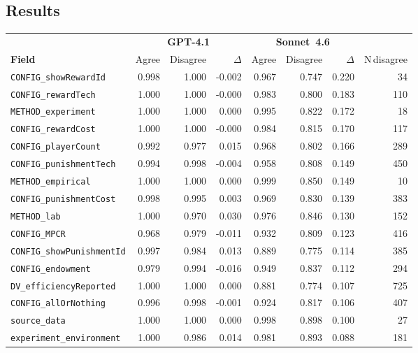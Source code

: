\documentclass[11pt,a4paper]{article}
\begin{document}
\subsection{Results}
\begin{center}\small
\begin{tabular}{lrr@{\hskip 6pt}rrr@{\hskip 6pt}rr}
\toprule
 & \multicolumn{3}{c}{\textbf{GPT-4.1}} & \multicolumn{3}{c}{\textbf{Sonnet~4.6}} \\
\cmidrule(lr){2-4}\cmidrule(lr){5-7}
\textbf{Field} & Agree & Disagree & $\Delta$ & Agree & Disagree & $\Delta$ & N\,disagree \\
\midrule
\texttt{CONFIG\_showRewardId} & 0.998 & 1.000 & -0.002 & 0.967 & 0.747 & 0.220 & 34\\
\texttt{CONFIG\_rewardTech} & 1.000 & 1.000 & -0.000 & 0.983 & 0.800 & 0.183 & 110\\
\texttt{METHOD\_experiment} & 1.000 & 1.000 & 0.000 & 0.995 & 0.822 & 0.172 & 18\\
\texttt{CONFIG\_rewardCost} & 1.000 & 1.000 & -0.000 & 0.984 & 0.815 & 0.170 & 117\\
\texttt{CONFIG\_playerCount} & 0.992 & 0.977 & 0.015 & 0.968 & 0.802 & 0.166 & 289\\
\texttt{CONFIG\_punishmentTech} & 0.994 & 0.998 & -0.004 & 0.958 & 0.808 & 0.149 & 450\\
\texttt{METHOD\_empirical} & 1.000 & 1.000 & 0.000 & 0.999 & 0.850 & 0.149 & 10\\
\texttt{CONFIG\_punishmentCost} & 0.998 & 0.995 & 0.003 & 0.969 & 0.830 & 0.139 & 383\\
\texttt{METHOD\_lab} & 1.000 & 0.970 & 0.030 & 0.976 & 0.846 & 0.130 & 152\\
\texttt{CONFIG\_MPCR} & 0.968 & 0.979 & -0.011 & 0.932 & 0.809 & 0.123 & 416\\
\texttt{CONFIG\_showPunishmentId} & 0.997 & 0.984 & 0.013 & 0.889 & 0.775 & 0.114 & 385\\
\texttt{CONFIG\_endowment} & 0.979 & 0.994 & -0.016 & 0.949 & 0.837 & 0.112 & 294\\
\texttt{DV\_efficiencyReported} & 1.000 & 1.000 & 0.000 & 0.881 & 0.774 & 0.107 & 725\\
\texttt{CONFIG\_allOrNothing} & 0.996 & 0.998 & -0.001 & 0.924 & 0.817 & 0.106 & 407\\
\texttt{source\_data} & 1.000 & 1.000 & 0.000 & 0.998 & 0.898 & 0.100 & 27\\
\texttt{experiment\_environment} & 1.000 & 0.986 & 0.014 & 0.981 & 0.893 & 0.088 & 181\\

\end{tabular}
\end{center}
\end{document}
